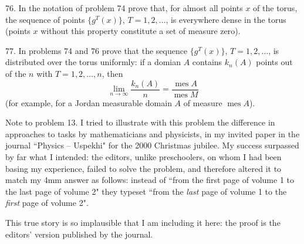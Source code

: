 \begin{problem}{76.}
	In the notation of problem 74 prove that, for almost all points $x$ of the torus,
	the sequence of points $\{g^T (x)\}$, $T=1, 2, \dots$, is everywhere dense in the torus
	(points $x$ without this property constitute a set of measure zero).
\end{problem}

\begin{problem}{77.}
	In problems 74 and 76 prove that the sequence $\{g^T (x)\}$, $T=1, 2, \dots$, is distributed
	over the torus uniformly: if a domian $A$ contains $k_n(A)$ points out of the $n$ with $T=1, 2, \dots,n$, then
	$$
	\lim_{n \to \infty} \frac{k_n(A)}{n}=\frac{\operatorname{mes} A}{\operatorname{mes} M}
	$$
	(for example, for a Jordan measurable domain $A$ of measure $\operatorname{mes} A$).
\end{problem}

\clearpage
\begin{note}{Note to problem 13.}
	I tried to illustrate with this problem the difference in approaches to tasks by mathematicians and physicists, in my invited paper in the journal ``Physics -- Uspekhi" for the 2000 Christmas jubilee. My success surpassed by far what I intended: the editors, unlike preschoolers, on whom I had been basing my experience, failed to solve the problem, and therefore altered it to match my 4mm answer as follows: instead of ``from the first page of volume 1 to the last page of volume 2"  they typeset  ``from the {\em last\/} page of volume 1 to the {\em first\/} page of volume 2".

	This true story is so implausible that I am including it here: the proof is the editors' version published by the journal.  
\end{note}
\clearpage

{\em
{}
}

